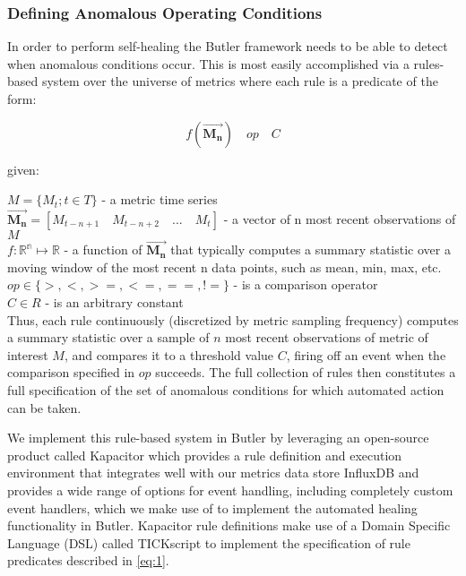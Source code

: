 \subsubsection{Defining Anomalous Operating Conditions}

In order to perform self-healing the Butler framework needs to be able to detect when anomalous conditions occur. This is most easily accomplished via a rules-based system over the universe of metrics where each rule is a predicate of the form:

\begin{equation}\label{eq:1}
    f(\vec{\mathbf{M_n}})\quad op \quad C
\end{equation}

given: 

$M = \{M_t; t \in T\}$ - a metric time series\\
$\vec{\mathbf{M_n}} = [M_{t-n+1} \quad M_{t-n+2} \quad ... \quad M_t]$ - a vector of n most recent observations of $M$\\
$f\colon \mathbb{R^{n}} \mapsto \mathbb{R}$ - a function of $\vec{\mathbf{M_n}}$ that typically computes a summary statistic over a moving window of the most recent n data points, such as mean, min, max, etc.\\
$op \in \{>,<, >=, <=, ==, !=\}$ - is a comparison operator\\
$C \in R$ - is an arbitrary constant\\

Thus, each rule continuously (discretized by metric sampling frequency) computes a summary statistic over a sample of $n$ most recent observations of metric of interest $M$, and compares it to a threshold value $C$, firing off an event when the comparison specified in $op$ succeeds. The full collection of rules then constitutes a full specification of the set of anomalous conditions for which automated action can be taken.

We implement this rule-based system in Butler by leveraging an open-source product called Kapacitor\autocite{kapacitor} which provides a rule definition and execution environment that integrates well with our metrics data store InfluxDB and provides a wide range of options for event handling, including completely custom event handlers, which we make use of to implement the automated healing functionality in Butler. Kapacitor rule definitions make use of a Domain Specific Language (DSL) called TICKscript to implement the specification of rule predicates described in \ref{eq:1}.

